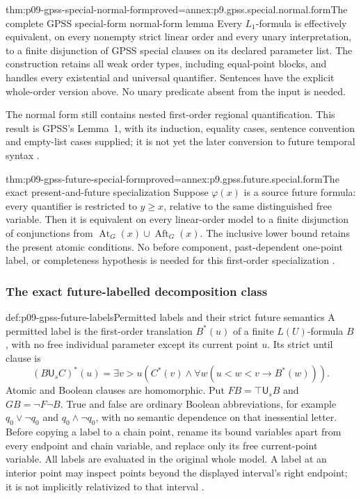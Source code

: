 \begin{hbtheorem}{thm:p09-gpss-special-normal-form}{proved=annex:p9.gpss.special.normal.form}{The complete GPSS special-form normal-form lemma}
Every \(L_1\)-formula is effectively equivalent, on every
nonempty strict linear order and every unary interpretation, to a
finite disjunction of GPSS special clauses on its declared parameter
list. The construction retains all weak order types, including
equal-point blocks, and handles every existential and universal
quantifier. Sentences have the explicit whole-order version above.
No unary predicate absent from the input is needed.

The normal form still contains nested first-order regional
quantification. This result is GPSS's Lemma~1, with its induction,
equality cases, sentence convention and empty-list cases supplied;
it is not yet the later conversion to future temporal syntax
\cite[Lemma~1, p.~170]{GabbayPnueliShelahStavi1980}.
\end{hbtheorem}

\begin{hbcorollary}{thm:p09-gpss-future-special-form}{proved=annex:p9.gpss.future.special.form}{The exact present-and-future specialization}
Suppose \(\varphi(x)\) is a source future formula: every
quantifier is restricted to \(y\geq x\), relative to the
same distinguished free variable. Then it is equivalent on every
linear-order model to a finite disjunction of conjunctions from
\(\operatorname{At}_G(x)\cup\operatorname{Aft}_G(x)\).
The inclusive lower bound retains the present atomic conditions.
No before component, past-dependent one-point label, or completeness
hypothesis is needed for this first-order specialization
\cite[pp.~169--170]{GabbayPnueliShelahStavi1980}.
\end{hbcorollary}

\subsubsection{The exact future-labelled decomposition class}

\begin{hbdefinition}{def:p09-gpss-future-labels}{Permitted labels and their strict future semantics}
A permitted label is the first-order translation \(B^*(u)\)
of a finite \(L(U)\)-formula \(B\), with no free individual
parameter except its current point \(u\). Its strict until clause is
\[
 (B\mathbin{\mathsf U_s}C)^*(u)=
 \exists v>u\left(C^*(v)\land
                  \forall w(u<w<v\to B^*(w))\right).
\]
Atomic and Boolean clauses are homomorphic. Put
\(FB=\top\mathbin{\mathsf U_s}B\) and \(GB=\neg F\neg B\).
True and false are ordinary Boolean abbreviations, for example
\(q_0\lor\neg q_0\) and \(q_0\land\neg q_0\), with
no semantic dependence on that inessential letter.
Before copying a label to a chain point, rename its bound variables
apart from every endpoint and chain variable, and replace only its
free current-point variable.
All labels are evaluated in the original whole model. A label at an
interior point may inspect points beyond the displayed interval's
right endpoint; it is not implicitly relativized to that interval
\cite[pp.~164, 169--170]{GabbayPnueliShelahStavi1980}.
\end{hbdefinition}

